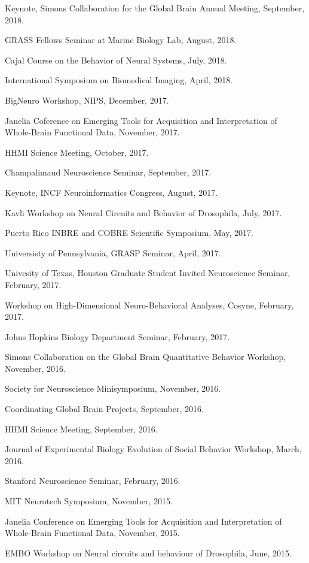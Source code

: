\documentclass[11pt, letterpaper]{awesome-cv}
\begin{document}
\begin{cvitems}
\item Keynote, Simons Collaboration for the Global Brain Annual Meeting, September, 2018.
\item GRASS Fellows Seminar at Marine Biology Lab, August, 2018.
\item Cajal Course on the Behavior of Neural Systems, July, 2018.
\item International Symposium on Biomedical Imaging, April, 2018. 
\item BigNeuro Workshop, NIPS, December, 2017.
\item Janelia Coference on Emerging Tools for Acquisition and Interpretation of Whole-Brain Functional Data, November, 2017.
\item HHMI Science Meeting, October, 2017. 
\item Champalimaud Neuroscience Seminar, September, 2017. 
\item Keynote, INCF Neuroinformatics Congress, August, 2017. 
\item Kavli Workshop on Neural Circuits and Behavior of Drosophila, July, 2017.
\item Puerto Rico INBRE and COBRE Scientific Symposium, May, 2017.
\item Universisty of Pennsylvania, GRASP Seminar, April, 2017.
\item Univesity of Texas, Houston Graduate Student Invited Neuroscience Seminar, February, 2017. 
\item Workshop on High-Dimensional Neuro-Behavioral Analyses, Cosyne, February, 2017.
\item Johns Hopkins Biology Department Seminar, February, 2017.
\item Simons Collaboration on the Global Brain Quantitative Behavior Workshop, November, 2016. 
\item Society for Neuroscience Minisymposium, November, 2016. 
\item Coordinating Global Brain Projects, September, 2016.
\item HHMI Science Meeting, September, 2016. 
\item Journal of Experimental Biology Evolution of Social Behavior Workshop, March, 2016. 
\item Stanford Neuroscience Seminar, February, 2016. 
\item MIT Neurotech Symposium, November, 2015. 
\item Janelia Conference on Emerging Tools for Acquisition and Interpretation of Whole-Brain Functional Data, November, 2015. 
\item EMBO Workshop on Neural circuits and behaviour of Drosophila, June, 2015.

\end{cvitems}
\end{document}
